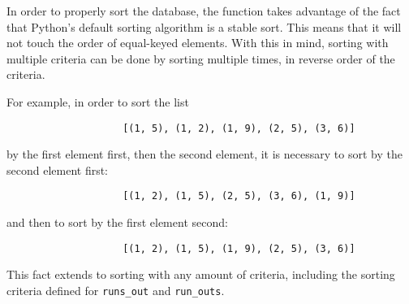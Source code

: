 \documentclass{article}
\begin{document}
				In order to properly sort the database, the function takes advantage of the fact that
				Python's default sorting algorithm is a stable sort. This means that it will not touch the
				order of equal-keyed elements. With this in mind, sorting with multiple criteria can be
				done by sorting multiple times, in reverse order of the criteria.

				For example, in order to sort the list

				\begin{verbatim}
					[(1, 5), (1, 2), (1, 9), (2, 5), (3, 6)]
				\end{verbatim}

				by the first element first, then the second element, it is necessary to sort by the second
				element first:

				\begin{verbatim}
					[(1, 2), (1, 5), (2, 5), (3, 6), (1, 9)]
				\end{verbatim}

				and then to sort by the first element second:

				\begin{verbatim}
					[(1, 2), (1, 5), (1, 9), (2, 5), (3, 6)]
				\end{verbatim}

				This fact extends to sorting with any amount of criteria, including the sorting criteria
				defined for \verb|runs_out| and \verb|run_outs|.
\end{document}
